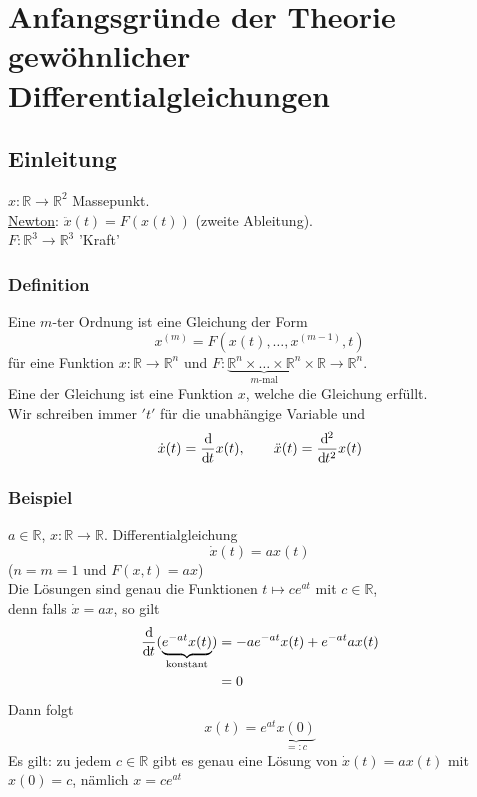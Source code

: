 \section{Anfangsgründe der Theorie gewöhnlicher Differentialgleichungen} %
\label{sec:anfangsgrunde_der_theorie_gewohnlicher_differentialgleichungen}

\subsection{Einleitung} %
\label{sub:einleitung}
$x: \mathbb{R} \to \mathbb{R}^2$ Massepunkt. \\
\underline{Newton}: $\ddot x(t)=F(x(t))$ (zweite Ableitung). \\
$F: \mathbb{R}^3 \to \mathbb{R}^3$ 'Kraft' \\
\subsubsection{Definition} %
\label{ssub:definition}

Eine  $m$-ter Ordnung ist eine Gleichung der Form
\[
	x^{(m)}=F(x(t),\dots,x^{(m-1)},t) 
\] für eine Funktion $x: \mathbb{R} \to \mathbb{R}^n$ und $F: \underset{m \text{-mal}}{\underbrace{\mathbb{R}^n \times \dots \times \mathbb{R}^n}} \times \mathbb{R} \to \mathbb{R}^n$. \\
Eine  der Gleichung ist eine Funktion $x$, welche die Gleichung erfüllt. \\
Wir schreiben immer $'t'$ für die unabhängige Variable und
\[
	\dot x(t) = \frac{\mathrm{d}\mkern-1.0mu }{\mathrm{d}\mkern-1.0mu t} x(t), \qquad \ddot x(t) = \frac{\mathrm{d}\mkern-1.0mu ^2}{\mathrm{d}\mkern-1.0mu t^2} x(t)
\]
\subsubsection{Beispiel} %
\label{ssub:beispiele}
 $a \in \mathbb{R}$, $x: \mathbb{R} \to \mathbb{R}$. Differentialgleichung
	\[
		\dot x(t)= ax(t)
	\]($n=m=1$ und $F(x,t)=ax$) \\
	Die Lösungen sind genau die Funktionen $t \mapsto ce^{at}$ mit $c \in \mathbb{R}$, \\
	denn falls $ \dot x = ax$, so gilt 
	\begin{align*}
		\frac{\mathrm{d}\mkern-1.0mu }{\mathrm{d}\mkern-1.0mu t} (\underset{\text{konstant}}{\underbrace{e^{-at}x(t)}})&= -ae^{-at}x(t)+e^{-at}ax(t) \\
		&= 0
	\end{align*}
Dann folgt
\[
	x(t)= e^{at}\underset{=:c}{\underbrace{x(0)}}
\]
Es gilt: zu jedem $c \in \mathbb{R}$ gibt es genau eine Lösung von $ \dot x(t)=ax(t)$ mit $x(0)=c$, nämlich $x=ce^{at}$
